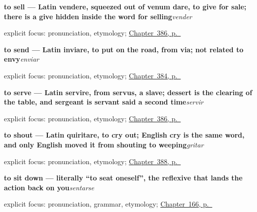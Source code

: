 \noindent\begin{minipage}[t]{\linewidth}
\raggedright
\textbf{to sell — Latin vendere, squeezed out of venum dare, to give for sale; there is a give hidden inside the word for selling}\enspace\emph{vender}\par
\footnotesize explicit focus: pronunciation, etymology; \hyperref[ch:vender-y-servir]{Chapter~386, p.~\pageref*{ch:vender-y-servir}}
\end{minipage}\par\smallskip

\noindent\begin{minipage}[t]{\linewidth}
\raggedright
\textbf{to send — Latin inviare, to put on the road, from via; not related to envy}\enspace\emph{enviar}\par
\footnotesize explicit focus: pronunciation, etymology; \hyperref[ch:enviar-y-subir]{Chapter~384, p.~\pageref*{ch:enviar-y-subir}}
\end{minipage}\par\smallskip

\noindent\begin{minipage}[t]{\linewidth}
\raggedright
\textbf{to serve — Latin servire, from servus, a slave; dessert is the clearing of the table, and sergeant is servant said a second time}\enspace\emph{servir}\par
\footnotesize explicit focus: pronunciation, etymology; \hyperref[ch:vender-y-servir]{Chapter~386, p.~\pageref*{ch:vender-y-servir}}
\end{minipage}\par\smallskip

\noindent\begin{minipage}[t]{\linewidth}
\raggedright
\textbf{to shout — Latin quiritare, to cry out; English cry is the same word, and only English moved it from shouting to weeping}\enspace\emph{gritar}\par
\footnotesize explicit focus: pronunciation, etymology; \hyperref[ch:empujar-y-lanzar]{Chapter~388, p.~\pageref*{ch:empujar-y-lanzar}}
\end{minipage}\par\smallskip

\noindent\begin{minipage}[t]{\linewidth}
\raggedright
\textbf{to sit down — literally \textquotedblleft{}to seat oneself\textquotedblright{}, the reflexive that lands the action back on you}\enspace\emph{sentarse}\par
\footnotesize explicit focus: pronunciation, grammar, etymology; \hyperref[ch:spanish-open-close-sit-stand]{Chapter~166, p.~\pageref*{ch:spanish-open-close-sit-stand}}
\end{minipage}\par\smallskip


